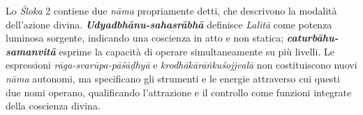Lo \textit{Śloka} 2 contiene due \textit{nāma} propriamente detti, che descrivono la modalità dell’azione divina. \textbf{\textit{Udyadbhānu-sahasrābhā}} definisce \textit{Lalitā} come potenza luminosa sorgente, indicando una coscienza in atto e non statica; \textbf{\textit{caturbāhu-samanvitā}} esprime la capacità di operare simultaneamente su più livelli. Le espressioni \textit{rāga-svarūpa-pāśāḍhyā} e \textit{krodhākārāṅkuśojjvalā} non costituiscono nuovi \textit{nāma} autonomi, ma specificano gli strumenti e le energie attraverso cui questi due nomi operano, qualificando l’attrazione e il controllo come funzioni integrate della coscienza divina.
